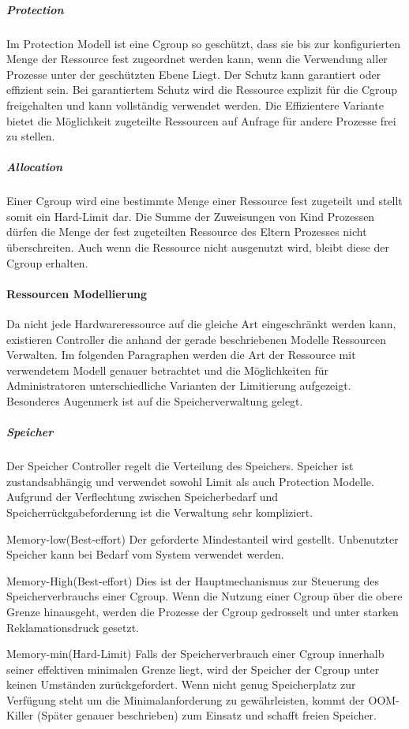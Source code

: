 \subparagraph{Protection}
Im Protection Modell ist eine Cgroup so geschützt, dass sie bis zur konfigurierten Menge der Ressource fest zugeordnet werden kann, wenn die Verwendung aller Prozesse unter der geschützten Ebene Liegt. Der Schutz kann garantiert oder effizient sein. Bei garantiertem Schutz wird die Ressource explizit für die Cgroup freigehalten und kann vollständig verwendet werden. Die Effizientere Variante bietet die Möglichkeit zugeteilte Ressourcen auf Anfrage für andere Prozesse frei zu stellen.


\subparagraph{Allocation}
Einer Cgroup wird eine bestimmte Menge einer Ressource fest zugeteilt und stellt somit ein Hard-Limit dar. Die Summe der Zuweisungen von Kind Prozessen dürfen die Menge der fest zugeteilten Ressource des Eltern Prozesses nicht überschreiten. Auch wenn die Ressource nicht ausgenutzt wird, bleibt diese der Cgroup erhalten. 


\paragraph{Ressourcen Modellierung}
Da nicht jede Hardwareressource auf die gleiche Art eingeschränkt werden kann, existieren Controller die anhand der gerade beschriebenen Modelle Ressourcen Verwalten. Im folgenden Paragraphen werden die Art der Ressource mit verwendetem Modell genauer betrachtet und die Möglichkeiten für Administratoren unterschiedliche Varianten der Limitierung aufgezeigt. Besonderes Augenmerk ist auf die Speicherverwaltung gelegt.

\subparagraph{Speicher}
Der Speicher Controller regelt die Verteilung des Speichers. Speicher ist zustandsabhängig und verwendet sowohl Limit als auch Protection Modelle. Aufgrund der Verflechtung zwischen Speicherbedarf und Speicherrückgabeforderung ist die Verwaltung sehr kompliziert.

Memory-low(Best-effort)
Der geforderte Mindestanteil wird gestellt. Unbenutzter Speicher kann bei Bedarf vom System verwendet werden.

Memory-High(Best-effort)
Dies ist der Hauptmechanismus zur Steuerung des Speicherverbrauchs einer Cgroup. Wenn die Nutzung einer Cgroup über die obere Grenze hinausgeht, werden die Prozesse der Cgroup gedrosselt und unter starken Reklamationsdruck gesetzt.

Memory-min(Hard-Limit)
Falls der Speicherverbrauch einer Cgroup innerhalb seiner effektiven minimalen Grenze liegt, wird der Speicher der Cgroup unter keinen Umständen zurückgefordert. Wenn nicht genug Speicherplatz zur Verfügung steht um die Minimalanforderung zu gewährleisten, kommt der OOM-Killer (Später genauer beschrieben) zum Einsatz und schafft freien Speicher.

